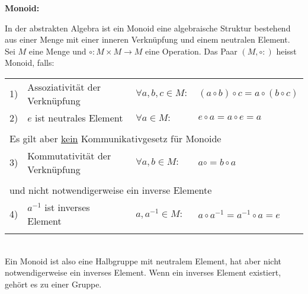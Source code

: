 \documentclass[
	final,
	a4paper,
	oneside,
	parskip=full,
	headings=standardclasses,
	headings=big,
	pointednumbers
]{scrartcl}
\def\myident{3cm}
\def\mysep{0pt}
\def\myrule{0pt}
\newenvironment{MyDef}
[2]
{%
    \setlength{\fboxsep}{\mysep}
    \setlength{\fboxrule}{\myrule}
    \hspace{-\myident}\fbox{\begin{minipage}[t]{\myident}\vspace{-0.5cm}\par\rule{\textwidth}{0.4pt}\par\hfill\textbf{#2}\enskip\,\end{minipage}}\begin{lrbox}{\mybox}\begin{minipage}[t]{\textwidth}\vspace{#1}
}
{%
    \end{minipage}\end{lrbox}\fbox{\usebox{\mybox}}
}
\begin{document}
    \begin{MyDef}{-0.26cm}{Def.}
        \textbf{Monoid:}
        
        In der abstrakten Algebra ist ein Monoid eine algebraische Struktur bestehend
        aus einer {\color{Blue}Menge} mit einer {\color{Blue}inneren Verknüpfung} und einem {\color{Blue}neutralen Element}. \\
        
        Sei $M$ eine Menge und $\circ: M \times M \to M$ eine Operation. Das Paar $\left(M, \circ:\right)$ heisst Monoid, falls: \\
        
        \hspace{-0.3cm}
        \begin{tabular}{llll}
            1) & Assoziativität der Verknüpfung & $\forall a,b,c \in M:$ & $(a \circ b) \circ c = a \circ (b \circ c)$ \\
            2) & $e$ ist neutrales Element      & $\forall a\in M:$      & $e \circ a = a \circ e = a$ \\
               &                                &                        & \\
            \multicolumn{4}{l}{Es gilt aber \uline{kein} Kommunikativgesetz für Monoide} \\
            3) & Kommutativität der Verknüpfung & $\forall a,b \in M:$   & $a \circ = b \circ a$ \\
               &                                &                        & \\
            \multicolumn{4}{l}{und nicht notwendigerweise ein inverse Elemente} \\
            4) & $a^{-1}$ ist inverses Element  & $a, a^{-1} \in M:$     & $ a \circ a^{-1} = a^{-1} \circ a = e $ \\
               &                                &                        & \\
        \end{tabular} \\
        
        Ein Monoid ist also eine Halbgruppe mit neutralem Element, hat aber nicht
        notwendigerweise ein inverses Element. Wenn ein inverses Element existiert,
        gehört es zu einer Gruppe.
    \end{MyDef}
    
\end{document}
